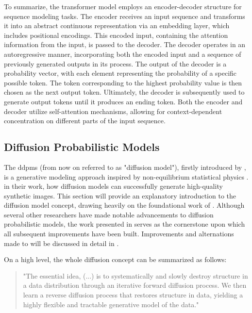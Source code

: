 To summarize, the transformer model employs an encoder-decoder structure for sequence modeling tasks. 
The encoder receives an input sequence and transforms it into an abstract continuous representation via an embedding layer, which includes positional encodings. 
This encoded input, containing the attention information from the input, is passed to the decoder. 
The decoder operates in an autoregressive manner, incorporating both the encoded input and a sequence of previously generated outputs in its process. 
The output of the decoder is a probability vector, with each element representing the probability of a specific possible token.
The token corresponding to the highest probability value is then chosen as the next output token.
Ultimately, the decoder is subsequently used to generate output tokens until it produces an ending token.
Both the encoder and decoder utilize self-attention mechanisms, allowing for context-dependent concentration on different parts of the input sequence.




\subsection{Diffusion Probabilistic Models}
\label{ch:preliminaries-diffusionProbabilisticModels}

The \Glspl{ddpm} (from now on referred to as "diffusion model"), firstly introduced by \textcite{sohl-dickstein2015DeepUnsupervisedLearning}, is a generative modeling approach inspired by non-equilibrium statistical physics \cite{sohl-dickstein2015DeepUnsupervisedLearning}.
\textcite{ho2020DenoisingDiffusionProbabilistic} in their work, how diffusion models can successfully generate high-quality synthetic images.
This section will provide an explanatory introduction to the diffusion model concept, drawing heavily on the foundational work of \cite{ho2020DenoisingDiffusionProbabilistic}.
Although several other researchers have made notable advancements to diffusion probabilistic models, the work presented in \cite{sohl-dickstein2015DeepUnsupervisedLearning, ho2020DenoisingDiffusionProbabilistic} 
serves as the cornerstone upon which all subsequent improvements have been built.
Improvements and alternations made to \cite{ho2020DenoisingDiffusionProbabilistic} will be discussed in detail in .

On a high level, the whole diffusion concept can be summarized as follows:

\begin{quotation}
  "The essential idea, (...) is to systematically and slowly destroy structure in a data distribution through an iterative forward diffusion process. 
  We then learn a reverse diffusion process that restores structure in data, yielding a highly flexible and tractable generative model of the data." \cite[p. 1]{sohl-dickstein2015DeepUnsupervisedLearning}
\end{quotation}

